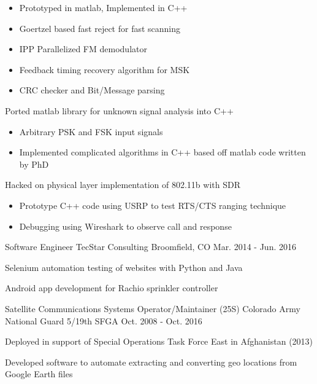 \begin{cventries}
{\begin{cvitems}
\begin{itemize}
          \item {Prototyped in matlab, Implemented in C++}
          \item {Goertzel based fast reject for fast scanning}
          \item {IPP Parallelized FM demodulator}
          \item {Feedback timing recovery algorithm for MSK}
          \item {CRC checker and Bit/Message parsing}
        \end{itemize}
        \item {Ported matlab library for unknown signal analysis into C++}
        \begin{itemize}
          \item {Arbitrary PSK and FSK input signals}
          \item {Implemented complicated algorithms in C++ based off matlab code written by PhD}
        \end{itemize}
        \item {Hacked on physical layer implementation of 802.11b with SDR}
        \begin{itemize}
          \item {Prototype C++ code using USRP to test RTS/CTS ranging technique}
          \item {Debugging using Wireshark to observe call and response}
        \end{itemize}
      \end{cvitems}
    }

  \cventry
    {Software Engineer} %
    {TecStar Consulting} %
    {Broomfield, CO} %
    {Mar. 2014 - Jun. 2016} %
    {
      \begin{cvitems} %
        \item {Selenium automation testing of websites with Python and Java}
        \item {Android app development for Rachio sprinkler controller}
      \end{cvitems}
    }

  \cventry
    {Satellite Communications Systems Operator/Maintainer (25S)} %
    {Colorado Army National Guard} %
    {5/19th SFGA} %
    {Oct. 2008 - Oct. 2016} %
    {
      \begin{cvitems} %
        \item {Deployed in support of Special Operations Task Force East in Afghanistan (2013)}
        \item {Developed software to automate extracting and converting geo locations from Google Earth files}
      \end{cvitems}
    }
    
\end{cventries}

